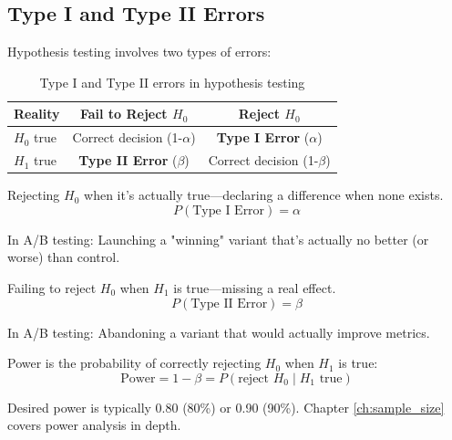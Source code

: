 \subsection{Type I and Type II Errors}

Hypothesis testing involves two types of errors:

\begin{table}[h]
\centering
\begin{tabular}{l|cc}
\hline
\textbf{Reality} & \textbf{Fail to Reject $H_0$} & \textbf{Reject $H_0$} \\
\hline
$H_0$ true & Correct decision (1-$\alpha$) & \textbf{Type I Error} ($\alpha$) \\
$H_1$ true & \textbf{Type II Error} ($\beta$) & Correct decision (1-$\beta$) \\
\hline
\end{tabular}
\caption{Type I and Type II errors in hypothesis testing}
\end{table}

\begin{definition}
Rejecting $H_0$ when it's actually true—declaring a difference when none exists.
\begin{equation}
P(\text{Type I Error}) = \alpha
\end{equation}

In A/B testing: Launching a "winning" variant that's actually no better (or worse) than control.
\end{definition}

\begin{definition}
Failing to reject $H_0$ when $H_1$ is true—missing a real effect.
\begin{equation}
P(\text{Type II Error}) = \beta
\end{equation}

In A/B testing: Abandoning a variant that would actually improve metrics.
\end{definition}

\begin{definition}
Power is the probability of correctly rejecting $H_0$ when $H_1$ is true:
\begin{equation}
\text{Power} = 1 - \beta = P(\text{reject } H_0 \mid H_1 \text{ true})
\end{equation}

Desired power is typically 0.80 (80\%) or 0.90 (90\%). Chapter \ref{ch:sample_size} covers power analysis in depth.
\end{definition}

